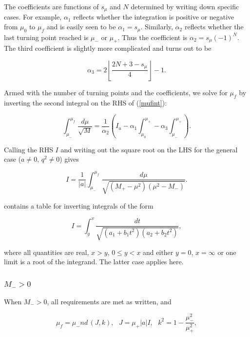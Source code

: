 \documentclass[apj]{emulateapj}
\begin{document}
The coefficients are functions of $s_\mu$ and $N$ determined by writing down specific cases. For example, $\alpha_1$ reflects whether the integration is positive or negative from $\mu_0$ to $\mu_f$ and is easily seen to be $\alpha_1 = s_\mu$. Similarly, $\alpha_2$ reflects whether the last turning point reached is $\mu_-$ or $\mu_+$. Thus the coefficient is $\alpha_2 = s_\mu (-1)^{N}$. The third coefficient is slightly more complicated and turns out to be

\begin{equation}
 \alpha_3 = 2 \left \lfloor \frac{2N+3-s_\mu}{4} \right \rfloor - 1.
\end{equation}

Armed with the number of turning points and the coefficients, we solve for $\mu_f$ by inverting the second integral on the RHS of (\ref{mufint}):

\begin{equation}
  \int_{\mu_-}^{\mu_f} \frac{d \mu}{\sqrt{M}} = \frac{1}{\alpha_2} \left ( I_u - \alpha_1 \int_{\mu_0}^{\mu_+} - \alpha_3 \int_{\mu_-}^{\mu_+} \right).
\end{equation}

\noindent Calling the RHS $I$ and writing out the square root on the LHS for the general case ($a \ne 0$, $q^2 \ne 0$) gives

\begin{equation}
 I = \frac{1}{\vert a \vert}\int_{\mu_-}^{\mu_f} \frac{d\mu}{\sqrt{(M_+-\mu^2)(\mu^2-M_-)}}.
\end{equation}
 
\citet{carlson2005} contains a table for inverting integrals of the form 

\begin{equation}\label{invertform}
  I = \int_y^x \frac{dt}{\sqrt{(a_1+b_1 t^2)(a_2+b_2t^2)}},
\end{equation}

\noindent where all quantities are real, $x > y$, $0 \le y < x$ and either $y=0$, $x=\infty$ or one limit is a root of the integrand. The latter case applies here. 

\subsubsection{$M_- > 0$}\label{mgt0}

When $M_- > 0$, all requirements are met as written, and

\begin{equation}\label{nd}
 \mu_f = \mu_- nd\hspace{2pt}(J,k), \hspace{8pt} J = \mu_+ \vert a \vert I, \hspace{8pt} k^2 = 1 - \frac{\mu_-^2}{\mu_+^2},
\end{equation}
\end{document}

